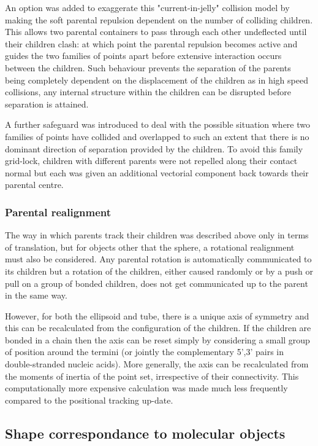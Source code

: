 An option was added to exaggerate this "current-in-jelly" collision model by making
the soft parental repulsion dependent on the number of colliding children.   This
allows two parental containers to pass through each other undeflected until their
children clash: at which point the parental repulsion becomes active and guides the
two families of points apart before extensive interaction occurs between the 
children.   Such behaviour prevents the separation of the parents being completely
dependent on the displacement of the children as in high speed collisions, any
internal structure within the children can be disrupted before separation is attained.

A further safeguard was introduced to deal with the possible situation where two
families of points have collided and overlapped to such an extent that there is no
dominant direction of separation provided by the children.   To avoid this family
grid-lock, children with different parents were not repelled along their contact
normal but each was given an additional vectorial component back towards their
parental centre.

\subsubsection{Parental realignment}

The way in which parents track their children was described above only in terms of
translation, but for objects other that the sphere, a rotational realignment must also
be considered.   Any parental rotation is automatically communicated to its children but
a rotation of the children, either caused randomly or by a push or pull on a group of
bonded children, does not get communicated up to the parent in the same way.

However, for both the ellipsoid and tube, there is a unique axis of symmetry and this can
be recalculated from the configuration of the children.  If the children are bonded
in a chain then the axis can be reset simply by considering a small group of position
around the termini (or jointly the complementary 5',3' pairs in double-stranded
nucleic acids).   More generally, the axis can be recalculated from the moments
of inertia of the point set, irrespective of their connectivity.
This computationally more expensive calculation was made much less frequently
compared to the positional tracking up-date. 

\subsection{Shape correspondance to molecular objects}

